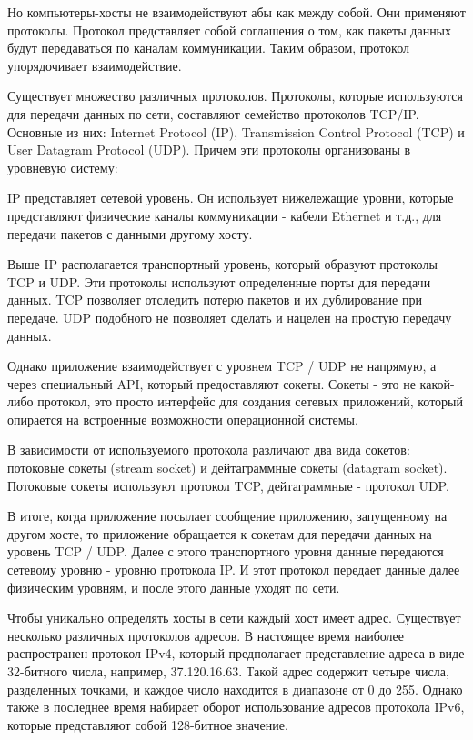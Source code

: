 \documentclass[a4paper, 12pt]{report}
\begin{document}
	Но компьютеры-хосты не взаимодействуют абы как между собой. Они применяют протоколы. Протокол представляет собой соглашения о том, как пакеты данных будут передаваться по каналам коммуникации. Таким образом, протокол упорядочивает взаимодействие.
	
	Существует множество различных протоколов. Протоколы, которые используются для передачи данных по сети, составляют семейство протоколов TCP/IP. Основные из них: Internet Protocol (IP), Transmission Control Protocol (TCP) и User Datagram Protocol (UDP). Причем эти протоколы организованы в уровневую систему:
	
	
	IP представляет сетевой уровень. Он использует нижележащие уровни, которые представляют физические каналы коммуникации - кабели Ethernet и т.д., для передачи пакетов с данными другому хосту.
	
	Выше IP располагается транспортный уровень, который образуют протоколы TCP и UDP. Эти протоколы используют определенные порты для передачи данных. TCP позволяет отследить потерю пакетов и их дублирование при передаче. UDP подобного не позволяет сделать и нацелен на простую передачу данных.
	
	Однако приложение взаимодействует с уровнем TCP / UDP не напрямую, а через специальный API, который предоставляют сокеты. Сокеты - это не какой-либо протокол, это просто интерфейс для создания сетевых приложений, который опирается на встроенные возможности операционной системы.
	
	В зависимости от используемого протокола различают два вида сокетов: потоковые сокеты (stream socket) и дейтаграммные сокеты (datagram socket). Потоковые сокеты используют протокол TCP, дейтаграммные - протокол UDP.
	
	В итоге, когда приложение посылает сообщение приложению, запущенному на другом хосте, то приложение обращается к сокетам для передачи данных на уровень TCP / UDP. Далее с этого транспортного уровня данные передаются сетевому уровню - уровню протокола IP. И этот протокол передает данные далее физическим уровням, и после этого данные уходят по сети.
	
	Чтобы уникально определять хосты в сети каждый хост имеет адрес. Существует несколько различных протоколов адресов. В настоящее время наиболее распространен протокол IPv4, который предполагает представление адреса в виде 32-битного числа, например, 37.120.16.63. Такой адрес содержит четыре числа, разделенных точками, и каждое число находится в диапазоне от 0 до 255. Однако также в последнее время набирает оборот использование адресов протокола IPv6, которые представляют собой 128-битное значение.
	
\end{document}
